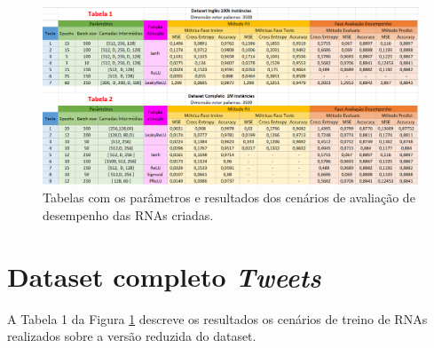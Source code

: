\newpage
\begin{figure}[H]
    \centering
    \includegraphics[scale=0.62, angle=90]{Imagens/tabelas.png}
    \caption{Tabelas com os parâmetros e resultados dos cenários de avaliação de desempenho das RNAs criadas.}
    \label{fig:tabelas}
\end{figure}

\section{Dataset completo \textit{Tweets}}

A Tabela 1 da Figura \ref{fig:tabelas} descreve os resultados os cenários de treino de RNAs realizados sobre a versão reduzida do dataset. 

